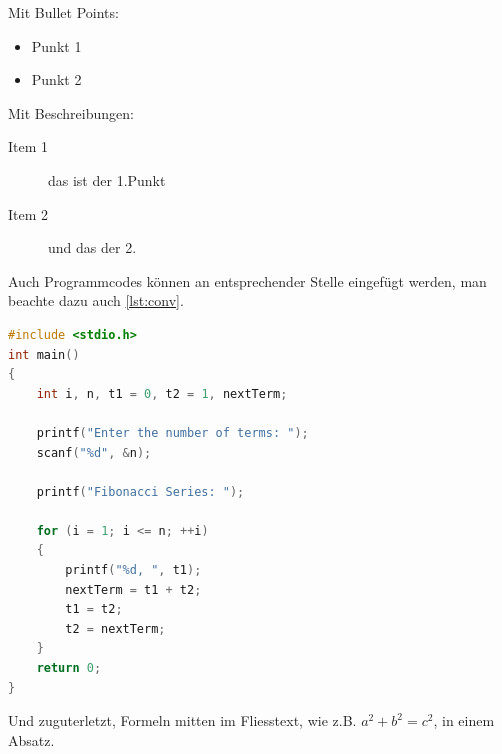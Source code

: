 Mit Bullet Points:

\begin{itemize}
	\item Punkt 1
	\item Punkt 2
\end{itemize}

Mit Beschreibungen:

\begin{description}
	\item[Item 1] das ist der 1.Punkt
	\item[Item 2] und das der 2.
\end{description}


Auch Programmcodes können an entsprechender Stelle eingefügt werden, man beachte dazu auch \cref{lst:conv}.


\begin{lstlisting}[frame=lines, caption=Simple Listing, captionpos=b, label = lst:conv, language=C, showstringspaces=false]
#include <stdio.h>
int main()
{
	int i, n, t1 = 0, t2 = 1, nextTerm;

	printf("Enter the number of terms: ");
	scanf("%d", &n);

	printf("Fibonacci Series: ");

	for (i = 1; i <= n; ++i)
	{
		printf("%d, ", t1);
		nextTerm = t1 + t2;
		t1 = t2;
		t2 = nextTerm;
	}
	return 0;
}
\end{lstlisting}

Und zuguterletzt, Formeln mitten im Fliesstext, wie z.B. $a^2+b^2=c^2$, in einem Absatz.
